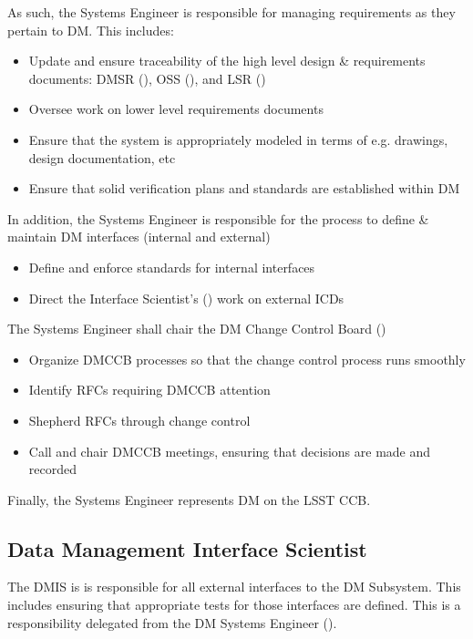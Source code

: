 As such, the \gls{Systems Engineer} is responsible for managing requirements as they pertain to \gls{DM}.
This includes:

\begin{itemize}
\item Update and ensure traceability of the high level design \& requirements documents: \gls{DMSR} (), \gls{OSS} (), and \gls{LSR} ()
\item Oversee work on lower level requirements documents
\item Ensure  that the system is appropriately modeled in terms of e.g. drawings, design documentation, etc
\item Ensure  that solid verification plans and standards are established within \gls{DM}
\end{itemize}

In addition, the \gls{Systems Engineer} is responsible for the process to define \& maintain \gls{DM} interfaces (internal and external)

\begin{itemize}
\item Define and enforce standards for internal interfaces
\item Direct the Interface Scientist's () work on external ICDs
\end{itemize}

The \gls{Systems Engineer} shall chair the \gls{DM} \gls{Change Control Board} ()

\begin{itemize}
\item Organize \gls{DMCCB} processes so that the change control process runs smoothly
\item Identify RFCs requiring \gls{DMCCB} attention
\item Shepherd RFCs through change control
\item Call and chair \gls{DMCCB} meetings, ensuring that decisions are made and recorded
\end{itemize}

Finally, the \gls{Systems Engineer} represents \gls{DM} on the \gls{LSST} \gls{CCB}.

\subsection{Data Management Interface Scientist}\label{role:dmis}

The \gls{DMIS} is is responsible for all external interfaces to the \gls{DM} \gls{Subsystem}. This includes ensuring that appropriate tests for those interfaces are defined. This is a responsibility delegated from the \gls{DM} \gls{Systems Engineer} ().

